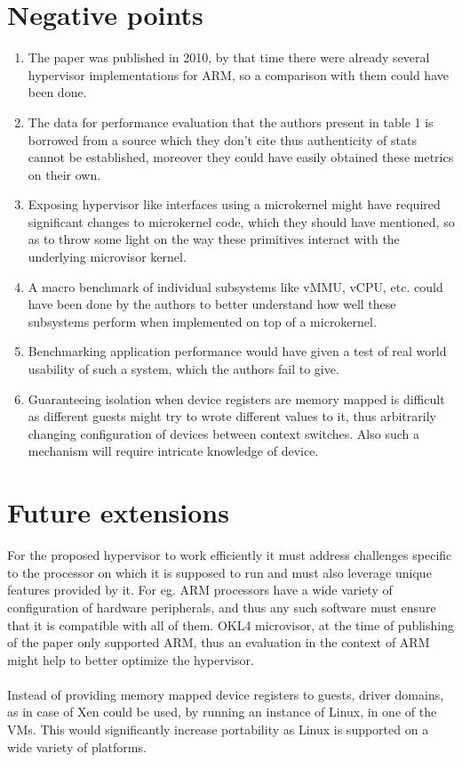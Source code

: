 \documentclass[a4paper,10pt]{article}
\begin{document}
\section{Negative points}
\begin{enumerate}
 \item The paper was published in 2010, by that time there were already several hypervisor implementations for ARM, so a comparison with them could have been done.
 \item The data for performance evaluation that the authors present in table 1 is borrowed from a source which they don't cite thus authenticity of stats cannot be established, moreover they could have easily obtained these metrics on their own.
 \item Exposing hypervisor like interfaces using a microkernel might have required significant changes to microkernel code, which they should have mentioned, so as to throw some light on the way these primitives interact with the underlying microvisor kernel.
 \item A macro benchmark of individual subsystems like vMMU, vCPU, etc. could have been done by the authors to better understand how well these subsystems perform when implemented on top of a microkernel.
 \item Benchmarking application performance would have given a test of real world usability of such a system, which the authors fail to give.
 \item Guaranteeing isolation when device registers are memory mapped is difficult as different guests might try to wrote different values to it, thus arbitrarily changing configuration of devices between context switches. Also such a mechanism will require intricate knowledge of device.
\end{enumerate}
\section{Future extensions}
For the proposed hypervisor to work efficiently it must address challenges specific to the processor on which it is supposed to run and must also leverage unique features provided by it.
For eg. ARM processors have a wide variety of configuration of hardware peripherals, and thus any such software must ensure that it is compatible with all of them.
OKL4 microvisor, at the time of publishing of the paper only supported ARM, thus an evaluation in the context of ARM might help to better optimize the hypervisor.
\\
\\
Instead of providing memory mapped device registers to guests, driver domains, as in case of Xen could be used, by running an instance of Linux, in one of the VMs. This would significantly increase portability as Linux is supported on a wide variety of platforms.
\end{document}
